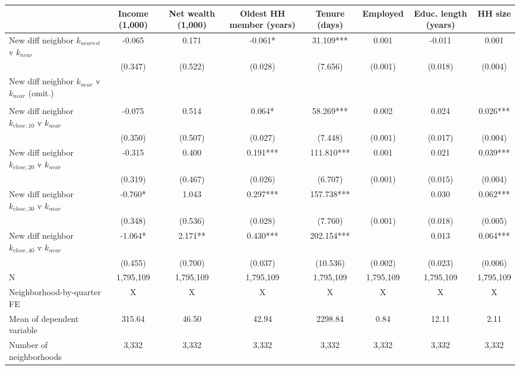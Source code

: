 \begin{tabular}[t]{lccccccc}
\toprule
  & Income (1,000) & Net wealth (1,000) & Oldest HH member (years) & Tenure (days) & Employed & Educ. length (years) & HH size\\
\midrule
New diff neighbor $k_{nearest}$ v $k_{near}$ & -0.065 & 0.171 & -0.061* & 31.109*** & 0.001 & -0.011 & 0.001\\
 & (0.347) & (0.522) & (0.028) & (7.656) & (0.001) & (0.018) & (0.004)\\
New diff neighbor $k_{near}$ v $k_{near}$ (omit.) &  &  &  &  &  &  & \\
 &  &  &  &  &  &  & \\
New diff neighbor $k_{close,10}$ v $k_{near}$ & -0.075 & 0.514 & 0.064* & 58.269*** & 0.002 & 0.024 & 0.026***\\
 & (0.350) & (0.507) & (0.027) & (7.448) & (0.001) & (0.017) & (0.004)\\
New diff neighbor $k_{close,20}$ v $k_{near}$ & -0.315 & 0.400 & 0.191*** & 111.810*** & 0.001 & 0.021 & 0.039***\\
 & (0.319) & (0.467) & (0.026) & (6.707) & (0.001) & (0.015) & (0.004)\\
New diff neighbor $k_{close,30}$ v $k_{near}$ & -0.760* & 1.043 & 0.297*** & 157.738*** &  & 0.030 & 0.062***\\
 & (0.348) & (0.536) & (0.028) & (7.760) & (0.001) & (0.018) & (0.005)\\
New diff neighbor $k_{close,40}$ v $k_{near}$ & -1.064* & 2.171** & 0.430*** & 202.154*** &  & 0.013 & 0.064***\\
 & (0.455) & (0.700) & (0.037) & (10.536) & (0.002) & (0.023) & (0.006)\\
\midrule
N & 1,795,109 & 1,795,109 & 1,795,109 & 1,795,109 & 1,795,109 & 1,795,109 & 1,795,109\\
Neighborhood-by-quarter FE & X & X & X & X & X & X & X\\
Mean of dependent variable & 315.64 & 46.50 & 42.94 & 2298.84 & 0.84 & 12.11 & 2.11\\
Number of neighborhoods & 3,332 & 3,332 & 3,332 & 3,332 & 3,332 & 3,332 & 3,332\\
\bottomrule
\end{tabular}